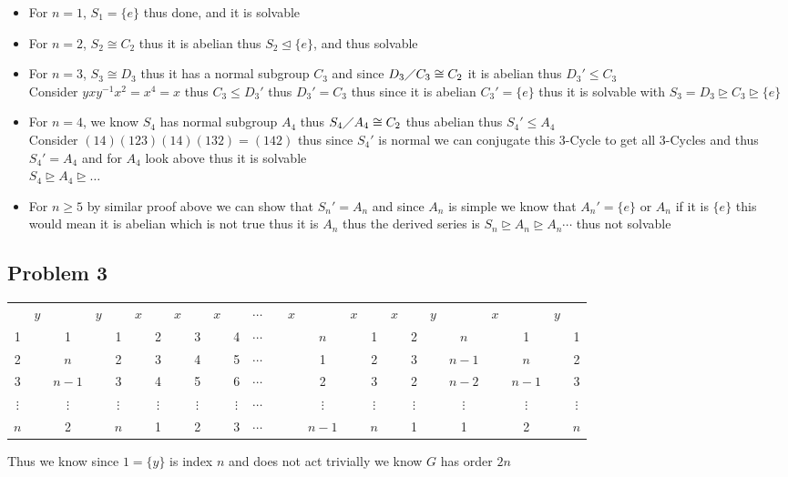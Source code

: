 \documentclass[12pt, letterpaper]{article}
\theoremstyle{definition}
\begin{document}
\begin{enumerate}[(a)]
\begin{itemize}
        \item For $n=1$, $S_1=\{e\}$ thus done, and it is solvable
        \item For $n=2$, $S_2 \cong C_2$ thus it is abelian thus $S_2 \unlhd \{e\}$, and thus solvable
        \item For $n=3$, $S_3 \cong D_3$ thus it has a normal subgroup $C_3$ and since $D_3 \diagup C_3 \cong C_2$ it is abelian thus $D_3' \leq C_3$\\
        Consider $yxy^{-1}x^2=x^4=x$ thus $C_3 \leq D_3'$ thus $D_3' = C_3$ thus since it is abelian $C_3'=\{e\}$ thus it is solvable with $S_3=D_3 \unrhd C_3 \unrhd \{e\}$
        \item For $n=4$, we know $S_4$ has normal subgroup $A_4$ thus $S_4 \diagup A_4 \cong C_2$ thus abelian thus $S_4' \leq A_4$\\
        Consider $(14)(123)(14)(132)=(142)$ thus since $S_4'$ is normal we can conjugate this 3-Cycle to get all 3-Cycles and thus $S_4'=A_4$ and for $A_4$ look above thus it is solvable\\
        $S_4 \unrhd A_4 \unrhd \dots$
        \item For $n\geq5$ by similar proof above we can show that $S_n'=A_n$ and since $A_n$ is simple we know that $A_n'=\{e\}$ or $A_n$ if it is $\{e\}$ this would mean it is abelian which is not true thus it is $A_n$ thus the
        derived series is $S_n \unrhd A_n \unrhd A_n \cdots$ thus not solvable
    \end{itemize}
\end{enumerate}

\newpage
\subsection*{Problem 3}
\begin{tabular}{c|ccc|c|ccccccccccc|c|ccccccc|c}
      & $y$ &   & $y$ &   & $x$ &   & $x$ &   & $x$ &   & $\cdots$ &   & $x$ &   & $x$ &   & $x$ &   & $y$ &   & $x$ &   & $y$ & \\
    1 &     & 1 &     & 1 &     & 2 &     & 3 &     & 4 & $\cdots$ &   &     &$n$&     & 1 &     & 2 &     &$n$&     & 1 &     & 1\\
    2 &     &$n$&     & 2 &     & 3 &     & 4 &     & 5 & $\cdots$ &   &     & 1 &     & 2 &     & 3 &     &$n-1$&   &$n$&     & 2\\
    3 &     &$n-1$&   & 3 &     & 4 &     & 5 &     & 6 & $\cdots$ &   &     & 2 &     & 3 &     & 2 &     &$n-2$&   &$n-1$&   & 3\\
$\vdots$&&$\vdots$&&$\vdots$&&$\vdots$&&$\vdots$&&$\vdots$& $\cdots$ & &     &$\vdots$&     &$\vdots$&     &$\vdots$&     &$\vdots$&     &$\vdots$&     &$\vdots$\\
   $n$&     & 2 &     &$n$&     & 1 &     & 2 &     & 3 & $\cdots$ &   &     &$n-1$&   &$n$&     & 1 &     & 1 &     & 2 &     &$n$\\
\end{tabular}
Thus we know since $1=\{y\}$ is index $n$ and does not act trivially we know $G$ has order $2n$
\end{document}
